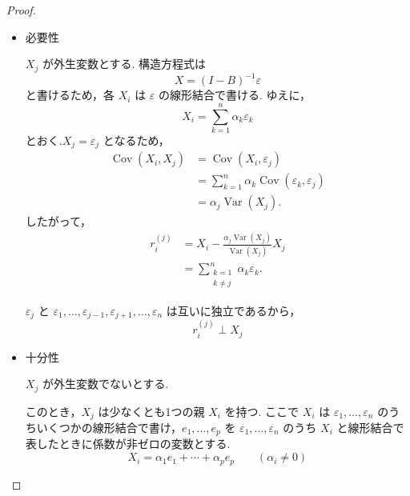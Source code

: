 \documentclass[uplatex, dvipdfmx]{jsarticle}
\begin{document}
\begin{proof} \quad

  \begin{itemize}
    \item 必要性
    
    $X_j$ が外生変数とする.
    構造方程式は
    \[
      X=(I-B)^{-1}\varepsilon
    \]
    と書けるため，各 $X_i$ は $\varepsilon$ の線形結合で書ける.
    ゆえに，
    \[
      X_i = \sum_{k=1}^{n} \alpha_k \varepsilon_k
    \]
    とおく.$X_j=\varepsilon_j$ となるため，
    \begin{align}
      \operatorname{Cov}(X_i,X_j) &= \operatorname{Cov}(X_i,\varepsilon_j) \\
      &= \sum_{k=1}^{n} \alpha_k \operatorname{Cov}(\varepsilon_k,\varepsilon_j) \\
      &= \alpha_j \operatorname{Var}(X_j).
    \end{align}
    したがって，
    \begin{align}
      r_i^{(j)} &= X_i - \frac{\alpha_j \operatorname{Var}(X_j)} {\operatorname{Var}(X_j)} X_j \\
      &= \sum_{\substack{k=1\\k\neq j}}^{n} \alpha_k \varepsilon_k.
    \end{align}

    $\varepsilon_j$ と $\varepsilon_1, \dots ,\varepsilon_{j-1},\varepsilon_{j+1}, \dots ,\varepsilon_n$ は互いに独立であるから，
    \[
    r_i^{(j)} \perp X_j
    \]

    \item 十分性 

    $X_j$ が外生変数でないとする.

    このとき，$X_j$ は少なくとも1つの親 $X_i$ を持つ.
    ここで $X_i$ は $\varepsilon_1,\ldots,\varepsilon_n$ のうちいくつかの線形結合で書け，$e_1,\ldots,e_p$ を $\varepsilon_1,\ldots,\varepsilon_n$ のうち $X_i$ と線形結合で表したときに係数が非ゼロの変数とする.
    \[
      X_i = \alpha_1 e_1 + \cdots + \alpha_p e_p \qquad (\alpha_i\neq0)
    \]


\end{itemize}
\end{proof}
\end{document}

